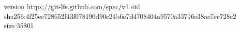 version https://git-lfs.github.com/spec/v1
oid sha256:4f25ec728652f43f078190d90c24b6e7d4708404a9570a33716e38ae7ec728c2
size 35801
